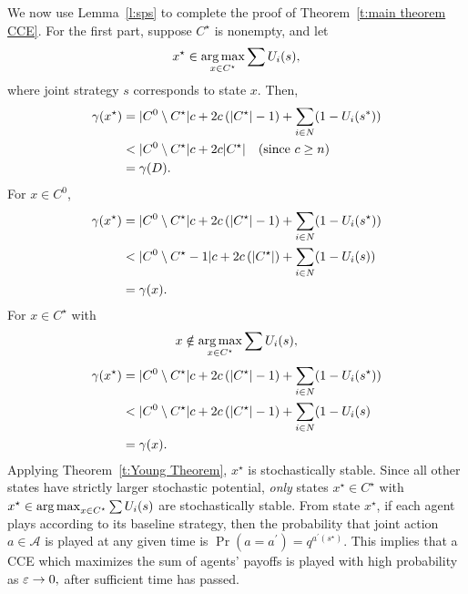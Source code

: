 

We now use Lemma~\ref{l:sps} to complete the proof of Theorem~\ref{t:main theorem CCE}. For the first part, suppose $C^\star$ is nonempty, and let $$x^\star\in \operatorname*{arg\,max}_{x\in C^\star} \sum{U_i(s)},$$ where joint strategy $s$ corresponds to state $x$.  Then,
\begin{align*}
\gamma(x^\star)  	&=  |C^0\setminus C^\star|c + 2c\left(|C^\star|-1\right) + \sum_{i\in N}(1 - U_i(s^*))\\
			&<  |C^0\setminus C^\star|c + 2c|C^\star|  \quad\text{(since $c\geq n$)} \\
			&= \gamma(D).
\end{align*}
For $x \in C^0$, 
\begin{align*}
\gamma(x^\star)  	&=  |C^0\setminus C^\star|c + 2c\left(|C^\star|-1\right) + \sum_{i\in N}(1 - U_i(s^\star))\\
			&<   |C^0\setminus C^\star - 1|c + 2c\left(|C^\star|\right) + \sum_{i\in N}(1 - U_i(s)) \\
			&=\gamma(x).
\end{align*}
For $x\in C^\star$ with $$x\notin \operatorname*{arg\,max}_{x\in C^\star} \sum{U_i(s)},$$
\begin{align*}
\gamma(x^\star)  	&=  |C^0\setminus C^\star|c + 2c\left(|C^\star|-1\right) + \sum_{i\in N}(1 - U_i(s^\star))\\
				&<  |C^0\setminus C^\star|c + 2c\left(|C^\star|-1\right) + \sum_{i\in N}(1 - U_i(s)\\
				&=\gamma(x).
\end{align*}
Applying Theorem~\ref{t:Young Theorem}, $x^\star$ is stochastically stable. Since all other states have strictly larger stochastic potential, \emph{only} states $x^\star\in C^\star$ with $x^\star\in \operatorname*{arg\,max}_{x\in C^\star} \sum{U_i(s)}$ are stochastically stable. From state $x^\star$, if each agent plays according to its baseline strategy, then the probability that joint action $a\in \mathcal{A}$ is played at any given time is $\Pr(a  = a^\prime) = q^{a^\prime(s^\star)}.$  This implies that a CCE which maximizes the sum of agents' payoffs is played with high probability as $\varepsilon\to 0,$ after sufficient time has passed.

